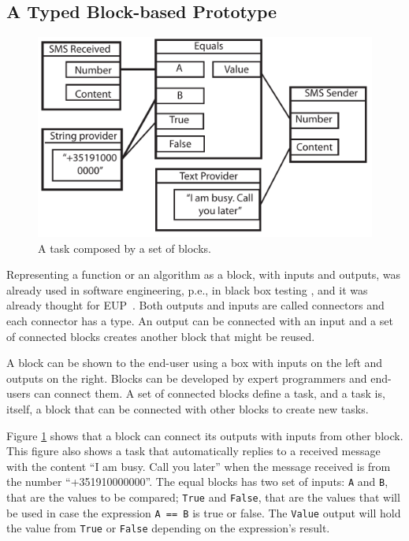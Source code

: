 \documentclass[9pt,a4paper]{extarticle}
\begin{document}
\begin{multicols}{2}
\subsection{A Typed Block-based Prototype}
\begin{figure}[H]
\centerline{\includegraphics[scale=.43]{block_example.pdf}}
\caption{A task composed by a set of blocks.} 
\label{fig:block}
\end{figure}

Representing a function or an algorithm as a block, with inputs and outputs, was already used in software engineering, p.e., in black box testing \cite{BlackBoxTesting}, and it was already thought for EUP~\cite{Zin2011}. Both outputs and inputs are called connectors and each connector has a type. An output can be connected with an input and a set of connected blocks creates another block that might be reused. 

A block can be shown to the end-user using a box with inputs on the left and outputs on the right. 
Blocks can be developed by expert programmers and end-users can connect them. A set of connected blocks define a task, and a task is, itself, a block that can be connected with other blocks to create new tasks.

Figure \ref{fig:block} shows that a block can connect its outputs with inputs from other block. This figure also shows a task that automatically replies to a received message with the content ``I am busy. Call you later'' when the message received is from the number ``+351910000000''. The equal blocks has two set of inputs: \texttt{A} and  \texttt{B}, that are the values to be compared; \texttt{True} and \texttt{False}, that are the values that will be used in case the expression \texttt{A == B} is true or false. The \texttt{Value} output will hold the value from \texttt{True} or \texttt{False} depending on the expression's result. 


\end{multicols}
\end{document}
